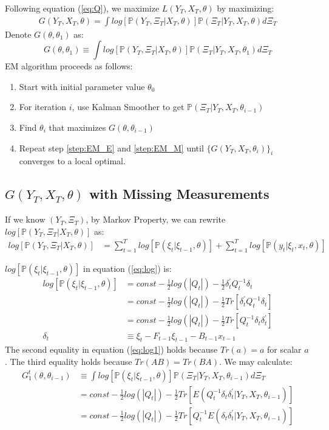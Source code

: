 \documentclass[12pt]{article}
\newenvironment{boenumerate}
    {\begin{enumerate}\renewcommand\labelenumi{\textbf\theenumi}}
    {\end{enumerate}}
\numberwithin{equation}{section}
\begin{document}
Following equation (\ref{eq:Q}), we maximize $L(Y_T,X_T,\theta)$ by maximizing: 
\begin{align}
    G(Y_T,X_T,\theta) = \int log[\mathbb{P}(Y_T,\Xi_T|X_T,\theta)]\mathbb{P}(\Xi_T|Y_T,X_T,\theta)d\Xi_T \label{eq:G}
\end{align}
Denote $G(\theta,\theta_1)$ as: 
\[
    G(\theta,\theta_1) \equiv \int log[\mathbb{P}(Y_T,\Xi_T|X_T,\theta)]\mathbb{P}(\Xi_T|Y_T,X_T,\theta_1)d\Xi_T
\]
EM algorithm proceeds as follows:
\begin{boenumerate}
    \item Start with initial parameter value $\theta_0$
    \item \label{step:EM_E} For iteration $i$, use Kalman Smoother to get $\mathbb{P}(\Xi_T|Y_T,X_T,\theta_{i-1})$
    \item \label{step:EM_M} Find $\theta_{i}$ that maximizes $G(\theta,\theta_{i-1})$    
    \item Repeat step \ref{step:EM_E} and \ref{step:EM_M} until $\{G(Y_T,X_T,\theta_i)\}_i$ converges to a local optimal.
\end{boenumerate}

\subsection{$G(Y_T,X_T,\theta)$ with Missing Measurements}
If we know $(Y_T,\Xi_T)$, by Markov Property, we can rewrite $log[\mathbb{P}(Y_T,\Xi_T|X_T,\theta)]$ as:
\begin{align}
    log[\mathbb{P}(Y_T,\Xi_T|X_T,\theta)] &= \sum_{t=1}^{T}log[\mathbb{P}(\xi_t|\xi_{t-1},\theta)] 
    + \sum_{t=1}^{T}log[\mathbb{P}(y_t|\xi_t,x_t,\theta)] \label{eq:log}
\end{align}

$log[\mathbb{P}(\xi_t|\xi_{t-1},\theta)]$ in equation (\ref{eq:log}) is:
\begin{align}
    log[\mathbb{P}(\xi_t|\xi_{t-1},\theta)] &= const-\frac{1}{2}log(|Q_t|) 
    -\frac{1}{2}\delta_t^{'}Q_t^{-1}\delta_t \nonumber \\
    &= const-\frac{1}{2}log(|Q_t|) 
    -\frac{1}{2}Tr[\delta_t^{'}Q_t^{-1}\delta_t] \nonumber \\
    &= const-\frac{1}{2}log(|Q_t|) 
    -\frac{1}{2}Tr[Q_t^{-1}\delta_t\delta_t^{'}] \label{eq:log1} \\
    \delta_t &\equiv \xi_t - F_{t-1}\xi_{t-1}-B_{t-1}x_{t-1} \nonumber
\end{align}
The second equality in equation (\ref{eq:log1}) holds because $Tr(a)=a$ for scalar $a$. The third equality holds because $Tr(AB)=Tr(BA)$. 
We may calculate:
\begin{align}
    G_1^{t}(\theta,\theta_{i-1}) &\equiv \int log[\mathbb{P}(\xi_t|\xi_{t-1},\theta)]\mathbb{P}(\Xi_T|Y_T,X_T,\theta_{i-1})d\Xi_T \nonumber \\
    &= const -\frac{1}{2}log(|Q_t|)-\frac{1}{2}Tr[E(Q_t^{-1}\delta_t\delta_t^{'}|Y_T,X_T,\theta_{i-1})] \nonumber \\
    &= const - \frac{1}{2}log(|Q_t|) - \frac{1}{2}Tr[Q_t^{-1}E(\delta_t\delta_t^{'}|Y_T,X_T,\theta_{i-1})] \label{eq:log1_trace}
\end{align}
\end{document}
